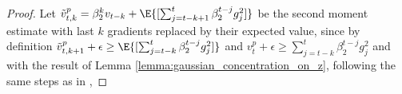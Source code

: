\documentclass[letterpaper]{article} %
\begin{document}
\begin{proof}
    Let $\Tilde{v}_{t, k}^{p} = \beta_2^{k} v_{t-k} + \E{[\sum_{j=t-k+1}^{t} \beta_2^{t-j} g_{j}^2]}$ be the second moment estimate with last $k$ gradients replaced by their expected value, since by definition $\Tilde{v}_{t, k+1}^{p} + \epsilon \geq \E{[\sum_{j=t-k}^{t} \beta_2^{t-j}g_{j}^2]}$ and $v_{t}^{p} + \epsilon \geq \sum_{j=t-k}^{t} \beta_2^{t-j}g_{j}^2$ and with the result of Lemma \ref{lemma:gaussian_concentration_on_z}, following the same steps as in \citep{défossez2022simple},

\end{proof}
\end{document}
